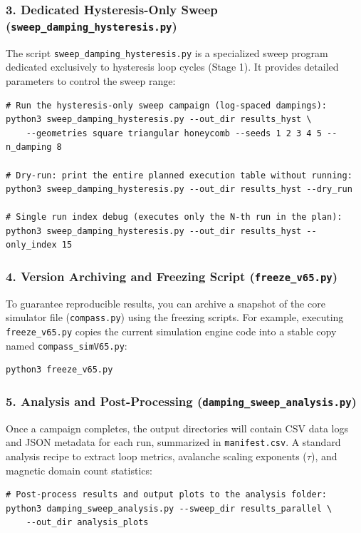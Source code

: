 \documentclass[11pt,a4paper]{article}
\newcommand{\code}[1]{\texttt{#1}}
\begin{document}
\subsubsection*{3. Dedicated Hysteresis-Only Sweep (\code{sweep\_damping\_hysteresis.py})}
The script \code{sweep\_damping\_hysteresis.py} is a specialized sweep program dedicated exclusively to hysteresis loop cycles (Stage 1). It provides detailed parameters to control the sweep range:

\begin{verbatim}
# Run the hysteresis-only sweep campaign (log-spaced dampings):
python3 sweep_damping_hysteresis.py --out_dir results_hyst \
    --geometries square triangular honeycomb --seeds 1 2 3 4 5 --n_damping 8

# Dry-run: print the entire planned execution table without running:
python3 sweep_damping_hysteresis.py --out_dir results_hyst --dry_run

# Single run index debug (executes only the N-th run in the plan):
python3 sweep_damping_hysteresis.py --out_dir results_hyst --only_index 15
\end{verbatim}

\subsubsection*{4. Version Archiving and Freezing Script (\code{freeze\_v65.py})}
To guarantee reproducible results, you can archive a snapshot of the core simulator file (\code{compass.py}) using the freezing scripts. For example, executing \code{freeze\_v65.py} copies the current simulation engine code into a stable copy named \code{compass\_simV65.py}:

\begin{verbatim}
python3 freeze_v65.py
\end{verbatim}

\subsubsection*{5. Analysis and Post-Processing (\code{damping\_sweep\_analysis.py})}
Once a campaign completes, the output directories will contain CSV data logs and JSON metadata for each run, summarized in \code{manifest.csv}. A standard analysis recipe to extract loop metrics, avalanche scaling exponents ($\tau$), and magnetic domain count statistics:

\begin{verbatim}
# Post-process results and output plots to the analysis folder:
python3 damping_sweep_analysis.py --sweep_dir results_parallel \
    --out_dir analysis_plots
\end{verbatim}
\end{document}
